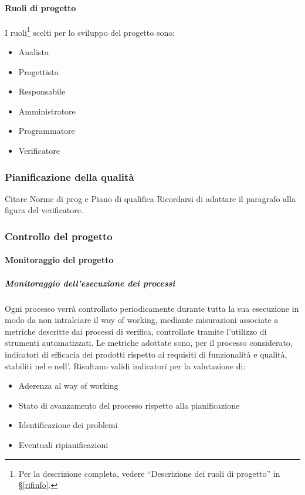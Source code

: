 			\paragraph{Ruoli di progetto}
			I ruoli\footnote{Per la descrizione completa, vedere ``Descrizione dei ruoli di progetto'' in \S\ref{rifinfo}.} scelti per lo sviluppo del progetto sono:
			\begin{itemize}[noitemsep]
				\item Analista
				\item Progettista
				\item Responsabile
				\item Amministratore
				\item Programmatore
				\item Verificatore
			\end{itemize}


		\subsubsection{Pianificazione della qualità}
		Citare Norme di prog e Piano di qualifica
		Ricordarsi di adattare il paragrafo alla figura del verificatore.

		\subsubsection{Controllo del progetto}

			\paragraph{Monitoraggio del progetto}

			\subparagraph{Monitoraggio dell'esecuzione dei processi}
			Ogni processo verrà controllato periodicamente durante tutta la sua esecuzione in modo da non intralciare il way of working,
			mediante misurazioni associate a metriche descritte dai processi di verifica, controllate tramite l'utilizzo di strumenti automatizzati.
			Le metriche adottate sono, per il processo considerato, indicatori di efficacia dei prodotti rispetto ai requisiti di funzionalità e qualità,
			stabiliti nel  e nell'. Risultano validi indicatori per la valutazione di:
			\begin{itemize}
				\item Aderenza al way of working
				\item Stato di avanzamento del processo rispetto alla pianificazione
				\item Identificazione dei problemi
				\item Eventuali ripianificazioni
			\end{itemize}

